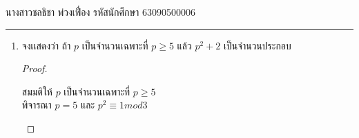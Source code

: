 \documentclass[12pt, a4paper]{article}
\begin{document}
\raggedleft นางสาวชลธิชา พ่วงเฟื่อง  รหัสนักศึกษา 63090500006 \\[12pt]
\hrule\vspace{12pt}
\raggedright

\begin{enumerate}
    \item จงเเสดงว่า ถ้า $p$ เป็นจำนวนเฉพาะที่ $p\geq 5$  แล้ว $p^{2}+2$ เป็นจำนวนประกอบ\\ 
    
    
    \begin{proof}
        \begin{enumerate}สมมติให้ $p$ เป็นจำนวนเฉพาะที่ $p\geq 5$ \\
        \hspace{1cm.}พิจารณา $p=5$ และ $p^{2}\equiv  1 mod 3$\\       
                
                        
        \end{enumerate}
    \end{proof}

\end{enumerate}
\end{document}
